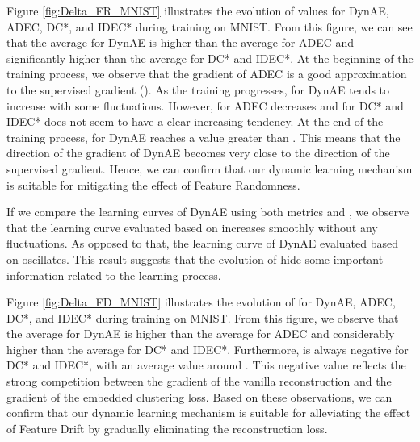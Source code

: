 \documentclass{article}
\begin{document}
Figure \ref{fig:Delta_FR_MNIST} illustrates the evolution of  values for DynAE, ADEC, DC*, and IDEC* during training on MNIST. From this figure, we can see that the average  for DynAE is higher than the average  for ADEC and significantly higher than the average  for DC* and IDEC*. At the beginning of the training process, we observe that the gradient of ADEC is a good approximation to the supervised gradient (). As the training progresses,  for DynAE tends to increase with some fluctuations. However,  for ADEC decreases and   for DC* and IDEC* does not seem to have a clear increasing tendency. At the end of the training process,  for DynAE reaches a value greater than . This means that the direction of the gradient of DynAE becomes very close to the direction of the supervised gradient. Hence, we can confirm that our dynamic learning mechanism is suitable for mitigating the effect of Feature Randomness.

\begin{figure*}[ht]
\vskip 0.2in
\centering
    \caption{ values during training on MNIST.}
\label{fig:Delta_FR_MNIST}
\end{figure*}

If we compare the learning curves of DynAE using both metrics  and , we observe that the learning curve evaluated based on  increases smoothly without any fluctuations. As opposed to that, the learning curve of DynAE evaluated based on  oscillates. This result suggests that the evolution of  hide some important information related to the learning process.  









Figure \ref{fig:Delta_FD_MNIST} illustrates the evolution of  for DynAE, ADEC, DC*, and IDEC* during training on MNIST. From this figure, we observe that the average  for DynAE is higher than the average  for ADEC and considerably higher than the average  for DC* and IDEC*. Furthermore,  is always negative for DC* and IDEC*, with an average value around . This negative value reflects the strong competition between the gradient of the vanilla reconstruction and the gradient of the embedded clustering loss. Based on these observations, we can confirm that our dynamic learning mechanism is suitable for alleviating the effect of Feature Drift by gradually eliminating the reconstruction loss.
\end{document}
